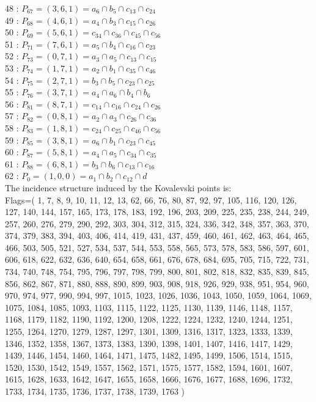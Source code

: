 \documentclass{article}
\begin{document}
{48 : $P_{67}=( 3, 6, 1 ) = a_{6} \cap b_{5} \cap c_{13} \cap c_{24}$\\
49 : $P_{68}=( 4, 6, 1 ) = a_{4} \cap b_{3} \cap c_{15} \cap c_{26}$\\
50 : $P_{69}=( 5, 6, 1 ) = c_{34} \cap c_{36} \cap c_{45} \cap c_{56}$\\
51 : $P_{71}=( 7, 6, 1 ) = a_{5} \cap b_{4} \cap c_{16} \cap c_{23}$\\
52 : $P_{73}=( 0, 7, 1 ) = a_{3} \cap a_{5} \cap c_{13} \cap c_{15}$\\
53 : $P_{74}=( 1, 7, 1 ) = a_{2} \cap b_{1} \cap c_{35} \cap c_{46}$\\
54 : $P_{75}=( 2, 7, 1 ) = b_{3} \cap b_{5} \cap c_{23} \cap c_{25}$\\
55 : $P_{76}=( 3, 7, 1 ) = a_{4} \cap a_{6} \cap b_{4} \cap b_{6}$\\
56 : $P_{81}=( 8, 7, 1 ) = c_{14} \cap c_{16} \cap c_{24} \cap c_{26}$\\
57 : $P_{82}=( 0, 8, 1 ) = a_{2} \cap a_{3} \cap c_{26} \cap c_{36}$\\
58 : $P_{83}=( 1, 8, 1 ) = c_{24} \cap c_{25} \cap c_{46} \cap c_{56}$\\
59 : $P_{85}=( 3, 8, 1 ) = a_{6} \cap b_{1} \cap c_{23} \cap c_{45}$\\
60 : $P_{87}=( 5, 8, 1 ) = a_{4} \cap a_{5} \cap c_{34} \cap c_{35}$\\
61 : $P_{88}=( 6, 8, 1 ) = b_{3} \cap b_{6} \cap c_{13} \cap c_{16}$\\
62 : $P_{0}=( 1, 0, 0 ) = a_{1} \cap b_{2} \cap c_{12} \cap d$\\
The incidence structure induced by the Kovalevski points is: 
\\
Flags=( 1, 7, 8, 9, 10, 11, 12, 13, 62, 66, 76, 80, 87, 92, 97, 105, 116, 120, 126, 127, 140, 144, 157, 165, 173, 178, 183, 192, 196, 203, 209, 225, 235, 238, 244, 249, 257, 260, 276, 279, 290, 292, 303, 304, 312, 315, 324, 336, 342, 348, 357, 363, 370, 374, 379, 383, 394, 403, 406, 414, 419, 431, 437, 459, 460, 461, 462, 463, 464, 465, 466, 503, 505, 521, 527, 534, 537, 544, 553, 558, 565, 573, 578, 583, 586, 597, 601, 606, 618, 622, 632, 636, 640, 654, 658, 661, 676, 678, 684, 695, 705, 715, 722, 731, 734, 740, 748, 754, 795, 796, 797, 798, 799, 800, 801, 802, 818, 832, 835, 839, 845, 856, 862, 867, 871, 880, 888, 890, 899, 903, 908, 918, 926, 929, 938, 951, 954, 960, 970, 974, 977, 990, 994, 997, 1015, 1023, 1026, 1036, 1043, 1050, 1059, 1064, 1069, 1075, 1084, 1085, 1093, 1103, 1115, 1122, 1125, 1130, 1139, 1146, 1148, 1157, 1168, 1179, 1182, 1190, 1192, 1200, 1208, 1222, 1224, 1232, 1240, 1244, 1251, 1255, 1264, 1270, 1279, 1287, 1297, 1301, 1309, 1316, 1317, 1323, 1333, 1339, 1346, 1352, 1358, 1367, 1373, 1383, 1390, 1398, 1401, 1407, 1416, 1417, 1429, 1439, 1446, 1454, 1460, 1464, 1471, 1475, 1482, 1495, 1499, 1506, 1514, 1515, 1520, 1530, 1542, 1549, 1557, 1562, 1571, 1575, 1577, 1582, 1594, 1601, 1607, 1615, 1628, 1633, 1642, 1647, 1655, 1658, 1666, 1676, 1677, 1688, 1696, 1732, 1733, 1734, 1735, 1736, 1737, 1738, 1739, 1763 )\\
}
\end{document}
